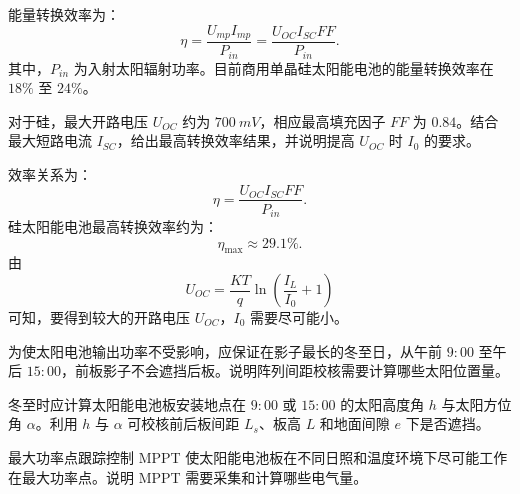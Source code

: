 \begin{solution}
能量转换效率为：
\begin{equation}
\eta = \frac{U_{mp}I_{mp}}{P_{in}}
= \frac{U_{OC}I_{SC}FF}{P_{in}}.
\end{equation}
其中，\(P_{in}\) 为入射太阳辐射功率。目前商用单晶硅太阳能电池的能量转换效率在 \(18\%\) 至 \(24\%\)。
\end{solution}

\begin{problem}[硅太阳能电池极限效率]\label{exer:calc_04_solar_p131_01}
对于硅，最大开路电压 \(U_{OC}\) 约为 \(\qty{700}{mV}\)，相应最高填充因子 \(FF\) 为 \(0.84\)。结合最大短路电流 \(I_{SC}\)，给出最高转换效率结果，并说明提高 \(U_{OC}\) 时 \(I_0\) 的要求。
\end{problem}

\begin{solution}
效率关系为：
\begin{equation}
\eta = \frac{U_{OC}I_{SC}FF}{P_{in}}.
\end{equation}
硅太阳能电池最高转换效率约为：
\begin{equation}
\eta_{\max} \approx 29.1\%.
\end{equation}
由
\begin{equation}
U_{OC} = \frac{KT}{q}\ln\left(\frac{I_L}{I_0}+1\right)
\end{equation}
可知，要得到较大的开路电压 \(U_{OC}\)，\(I_0\) 需要尽可能小。
\end{solution}

\begin{problem}[固定安装阵列间距校核]\label{exer:calc_04_solar_p157_01}
为使太阳电池输出功率不受影响，应保证在影子最长的冬至日，从午前 \(9:00\) 至午后 \(15:00\)，前板影子不会遮挡后板。说明阵列间距校核需要计算哪些太阳位置量。
\end{problem}

\begin{solution}
冬至时应计算太阳能电池板安装地点在 \(9:00\) 或 \(15:00\) 的太阳高度角 \(h\) 与太阳方位角 \(\alpha\)。利用 \(h\) 与 \(\alpha\) 可校核前后板间距 \(L_s\)、板高 \(L\) 和地面间隙 \(e\) 下是否遮挡。
\end{solution}

\begin{problem}[最大功率点跟踪控制]\label{exer:calc_04_solar_p169_01}
最大功率点跟踪控制 MPPT 使太阳能电池板在不同日照和温度环境下尽可能工作在最大功率点。说明 MPPT 需要采集和计算哪些电气量。
\end{problem}

